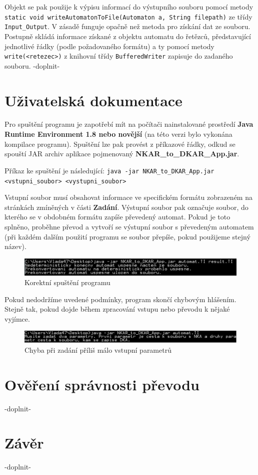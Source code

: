 \documentclass[11pt]{article}
\begin{document}
Objekt se pak použije k výpisu informací do výstupního souboru pomocí metody \texttt{static void writeAutomatonToFile(Automaton a, String filepath)} ze třídy \texttt{Input\_Output}. V zásadě funguje opačně než metoda pro získání dat ze souboru. Postupně skládá informace získané z objektu automatu do řetězců, představující jednotlivé řádky (podle požadovaného formátu) a ty pomocí metody \texttt{write(<retezec>)} z knihovní třídy \texttt{BufferedWriter} zapisuje do zadaného souboru. 
-doplnit-

\newpage

\section{Uživatelská dokumentace}

Pro spuštění programu je zapotřebí mít na počítači nainstalované prostředí \textbf{Java Runtime Environment 1.8 nebo novější} (na této verzi bylo vykonána kompilace programu). Spuštění lze pak provést z příkazové řádky, odkud se spouští JAR archiv aplikace pojmenovaný \textbf{NKAR\_to\_DKAR\_App.jar}.

Příkaz ke spuštění je následující: \texttt{java -jar NKAR\_to\_DKAR\_App.jar <vstupni\_soubor> <vystupni\_soubor>}

Vstupní soubor musí obsahovat informace ve specifickém formátu zobrazeném na stránkách zmíněných v části \textbf{Zadání}. Výstupní soubor pak označuje soubor, do kterého se v obdobném formátu zapíše převedený automat. Pokud je toto splněno, proběhne převod a vytvoří se výstupní soubor s převedeným automatem (při každém dalším použití programu se soubor přepíše, pokud použijeme stejný název).

\begin{figure}[htbp]
\centering
\includegraphics[width = 15cm]{success.jpg}
\begin{center}
\caption{Korektní spuštění programu}
\end{center}
\end{figure}

Pokud nedodržíme uvedené podmínky, program skončí chybovým hlášením. Stejně tak, pokud dojde během zpracování vstupu nebo převodu k nějaké vyjímce.

\begin{figure}[htbp]
\centering
\includegraphics[width = 15cm]{fail.jpg}
\begin{center}
\caption{Chyba při zadání příliš málo vstupní parametrů}
\end{center}
\end{figure}

\newpage

\section{Ověření správnosti převodu}

-doplnit-

\newpage

\section{Závěr}

-doplnit-
\end{document}
